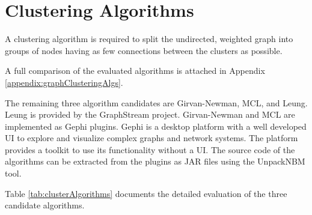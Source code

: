 \section{Clustering Algorithms}

A clustering algorithm is required to split the undirected, weighted graph into groups of nodes having as few connections between the clusters as possible. 

A full comparison of the evaluated algorithms is attached in Appendix \ref{appendix:graphClusteringAlgs}.

The remaining three algorithm candidates are Girvan-Newman, MCL, and Leung. Leung is provided by the GraphStream project. Girvan-Newman and MCL are implemented as Gephi plugins. Gephi is a desktop platform with a well developed \gls{UI} to explore and visualize complex graphs and network systems. The platform provides a toolkit to use its functionality without a \gls{UI}.  The source code of the algorithms can be extracted from the plugins as \gls{JAR} files using the UnpackNBM tool\cite{unpackNBM}.

Table \ref{tab:clusterAlgorithms} documents the detailed evaluation of the three candidate algorithms. 

